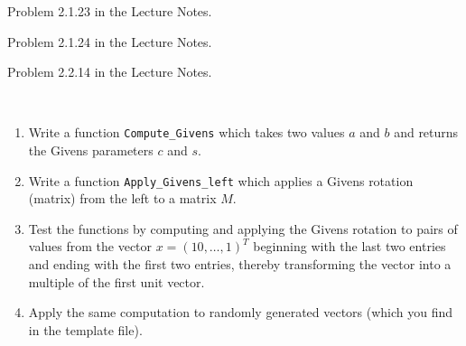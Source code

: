 
\begin{Sheet}
  \label{sheet3}
  
  \begin{Problem}
    Problem 2.1.23 in the Lecture Notes.
  \end{Problem}

  \begin{Problem}
  	Problem 2.1.24 in the Lecture Notes.
  \end{Problem}

  \begin{Problem}
  	Problem 2.2.14 in the Lecture Notes.
  \end{Problem}

  \begin{Problem}
	  ~\\[-\baselineskip]
	  \begin{enumerate}
		\item Write a function \texttt{Compute\_Givens} which takes two values $a$ and $b$ and returns the Givens parameters $c$ and $s$.
		\item Write a function \texttt{Apply\_Givens\_left} which applies a Givens rotation (matrix) from the left to a matrix $M$.
		\item Test the functions by computing and applying the Givens rotation to pairs of values from the vector $x=(10,\ldots,1)^T$ beginning with the last two entries and ending with the first two entries, 
			thereby transforming the vector into a multiple of the first unit vector.
		\item Apply the same computation to randomly generated vectors (which you find in the template file).
	\end{enumerate}
  \end{Problem}

\end{Sheet}


